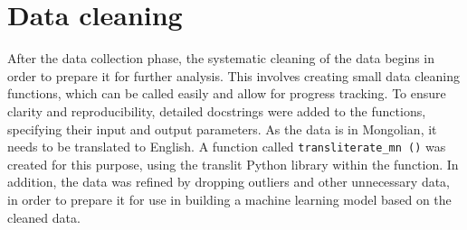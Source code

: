 \documentclass[11pt, a4paper, leqno]{article}
\begin{document}
\section{Data cleaning} %
\label{sec:data_cleaning}
After the data collection phase, the systematic cleaning of the data begins in order to prepare it for further analysis.
This involves creating small data cleaning functions, which can be called easily and allow for progress tracking.
To ensure clarity and reproducibility, detailed docstrings were added to the functions, specifying their input and output parameters.
As the data is in Mongolian, it needs to be translated to English. A function called \texttt{transliterate\_mn ()} was created for this purpose,
using the translit Python library within the function.
In addition, the data was refined by dropping outliers and other unnecessary data, in order to prepare it for use in building a machine learning model based on the cleaned data.

\printbibliography
{}



\end{document}
